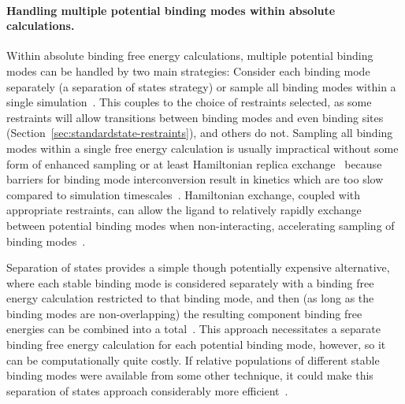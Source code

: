 \documentclass[9pt,bestpractices]{livecoms}
\begin{document}
\paragraph{Handling multiple potential binding modes within absolute calculations.}
Within absolute binding free energy calculations, multiple potential binding modes can be handled by two main strategies: Consider each binding mode separately (a separation of states strategy) or sample all binding modes within a single simulation~\cite{mobley2012perspective}.
This couples to the choice of restraints selected, as some restraints will allow transitions between binding modes and even binding sites (Section~\ref{sec:standardstate-restraints}), and others do not.
%
Sampling all binding modes within a single free energy calculation is usually impractical without some form of enhanced sampling or at least Hamiltonian replica exchange~\cite{wang2013identifying} because barriers for binding mode interconversion result in kinetics which are too slow compared to simulation timescales~\cite{mobley2006use, palma2012computation,mobley2012perspective, gill2018binding}.
Hamiltonian exchange, coupled with appropriate restraints, can allow the ligand to relatively rapidly exchange between potential binding modes when non-interacting, accelerating sampling of binding modes~\cite{wang2013identifying}.

Separation of states provides a simple though potentially expensive alternative, where each stable binding mode is considered separately with a binding free energy calculation restricted to that binding mode, and then (as long as the binding modes are non-overlapping) the resulting component binding free energies can be combined into a total~\cite{mobley2006use, mobley2012perspective}.
This approach necessitates a separate binding free energy calculation for each potential binding mode, however, so it can be computationally quite costly.
If relative populations of different stable binding modes were available from some other technique, it could make this separation of states approach considerably more efficient~\cite{mobley2012perspective, gill2018binding}.
%
\end{document}
